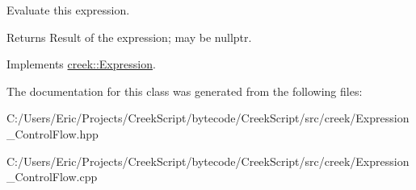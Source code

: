 Evaluate this expression. 

\begin{DoxyReturn}{Returns}
Result of the expression; may be {\ttfamily nullptr}. 
\end{DoxyReturn}


Implements \hyperlink{classcreek_1_1_expression_a3c7fe4a04e24c8d907f918240e2bf43d}{creek\+::\+Expression}.



The documentation for this class was generated from the following files\+:\begin{DoxyCompactItemize}
\item 
C\+:/\+Users/\+Eric/\+Projects/\+Creek\+Script/bytecode/\+Creek\+Script/src/creek/Expression\+\_\+\+Control\+Flow.\+hpp\item 
C\+:/\+Users/\+Eric/\+Projects/\+Creek\+Script/bytecode/\+Creek\+Script/src/creek/Expression\+\_\+\+Control\+Flow.\+cpp\end{DoxyCompactItemize}
